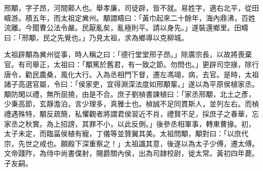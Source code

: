 \begin{pinyinscope}
 
 
 邢顒，字子昂，河間鄚人也。舉孝廉，司徒辟，皆不就。易姓字，適右北平，從田疇游。積五年，而太祖定兾州。顒謂疇曰：「黃巾起來二十餘年，海內鼎沸，百姓流離。今聞曹公法令嚴。民厭亂矣，亂極則平。請以身先。」遂裝還鄉里。田疇曰：「邢顒，民之先覺也。」乃見太祖，求為鄉導以克柳城。
 
 
 
 
 太祖辟顒為兾州從事，時人稱之曰：「德行堂堂邢子昂。」除廣宗長，以故將喪棄官。有司舉正，太祖曰：「顒篤於舊君，有一致之節。勿問也。」更辟司空掾，除行唐令，勸民農桑，風化大行。入為丞相門下督，遷左馮翊，病，去官。是時，太祖諸子高選官屬，令曰：「侯家吏，宜得淵深法度如邢顒輩。」遂以為平原侯植家丞。顒防閑以禮，無所屈撓，由是不合。庶子劉楨書諫植曰：「家丞邢顒，北土之彥，少秉高節，玄靜澹泊，言少理多，真雅士也。楨誠不足同貫斯人，並列左右。而楨禮遇殊特，顒反疏簡，私懼觀者將謂君侯習近不肖，禮賢不足，採庶子之春華，忘家丞之秋實。為上招謗，其罪不小，以此反側。」後參丞相軍事，轉東曹掾。初，太子未定，而臨菑侯植有寵，丁儀等並贊翼其美。太祖問顒，顒對曰：「以庶代宗，先世之戒也。願殿下深重察之！」太祖識其意，後遂以為太子少傅，遷太傅。文帝踐阼，為侍中尚書僕射，賜爵關內侯，出為司隷校尉，徙太常。黃初四年薨。子友嗣。
 
 
 
 
\end{pinyinscope}